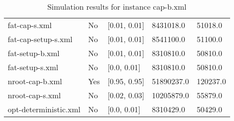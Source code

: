 \begin{table}[!hbp]
\begin{tabular}{lllll}
fat-cap-s.xml 	& No 	&  [0.01, 0.01] 	& 8431018.0 	& 51018.0\\
fat-cap-setup-s.xml 	& No 	&  [0.01, 0.01] 	& 8541100.0 	& 51100.0\\
fat-setup-b.xml 	& No 	&  [0.01, 0.01] 	& 8310810.0 	& 50810.0\\
fat-setup-s.xml 	& No 	&  [0.0, 0.01] 	& 8310810.0 	& 50810.0\\
nroot-cap-b.xml 	& Yes 	&  [0.95, 0.95] 	& 51890237.0 	& 120237.0\\
nroot-cap-s.xml 	& No 	&  [0.02, 0.03] 	& 10205879.0 	& 55879.0\\
opt-deterministic.xml 	& No 	&  [0.0, 0.01] 	& 8310429.0 	& 50429.0\\
\hline
\end{tabular}
\caption{Simulation results for instance cap-b.xml}
\end{table}


